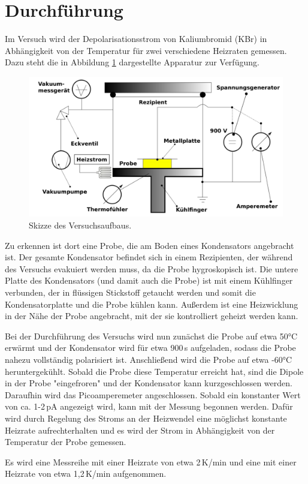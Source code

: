 \section{Durchführung}
\label{sec:Durchführung}

Im Versuch wird der Depolarisationsstrom von Kaliumbromid (KBr) in Abhängigkeit
von der Temperatur für zwei verschiedene Heizraten gemessen. Dazu steht die in
Abbildung \ref{fig:aufbau} dargestellte Apparatur zur Verfügung.

\begin{figure}
  \centering
  \includegraphics[width=\textwidth]{data/aufbau.png}
  \caption{Skizze des Versuchsaufbaus.}
  \label{fig:aufbau}
\end{figure}

Zu erkennen ist dort eine Probe, die am Boden eines Kondensators angebracht ist.
Der gesamte Kondensator befindet sich in einem Rezipienten, der während des
Versuchs evakuiert werden muss, da die Probe hygroskopisch ist. Die untere Platte
des Kondensators (und damit auch die Probe) ist mit einem Kühlfinger verbunden,
der in flüssigen Stickstoff getaucht werden und somit die Kondensatorplatte
und die Probe kühlen kann. Außerdem ist eine Heizwicklung in der Nähe der
Probe angebracht, mit der sie kontrolliert geheizt werden kann.

Bei der Durchführung des Versuchs wird nun zunächst die Probe auf etwa 50°C erwärmt
und der Kondensator wird für etwa 900\,s aufgeladen, sodass die Probe nahezu vollständig
polarisiert ist. Anschließend wird die Probe auf etwa -60°C heruntergekühlt.
Sobald die Probe diese Temperatur erreicht hat, sind die Dipole in der Probe
"eingefroren" und der Kondensator kann kurzgeschlossen werden. Daraufhin wird das
Picoamperemeter angeschlossen. Sobald ein konstanter Wert von ca. 1-2\,pA angezeigt
wird, kann mit der Messung begonnen werden. Dafür wird durch Regelung des Stroms
an der Heizwendel eine möglichst konstante Heizrate aufrechterhalten und es wird
der Strom in Abhängigkeit von der Temperatur der Probe gemessen.

Es wird eine Messreihe mit einer Heizrate von etwa 2\,K/min und eine mit einer Heizrate
von etwa 1{,}2\,K/min aufgenommen.
